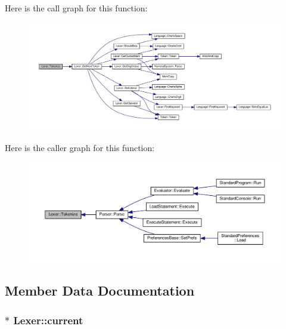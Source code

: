 Here is the call graph for this function\+:
\nopagebreak
\begin{figure}[H]
\begin{center}
\leavevmode
\includegraphics[width=350pt]{d6/dc0/classLexer_a02696cb1f974ae74116c2b746dcba365_cgraph}
\end{center}
\end{figure}




Here is the caller graph for this function\+:
\nopagebreak
\begin{figure}[H]
\begin{center}
\leavevmode
\includegraphics[width=350pt]{d6/dc0/classLexer_a02696cb1f974ae74116c2b746dcba365_icgraph}
\end{center}
\end{figure}




\subsection{Member Data Documentation}
\subsubsection[{\texorpdfstring{current}{current}}]{$\ast$ Lexer\+::current\hspace{0.3cm}{\ttfamily [private]}}\hypertarget{classLexer_a64f66ae0d280ab2d4f4b8e2ac5d8c4c5}{}\label{classLexer_a64f66ae0d280ab2d4f4b8e2ac5d8c4c5}


